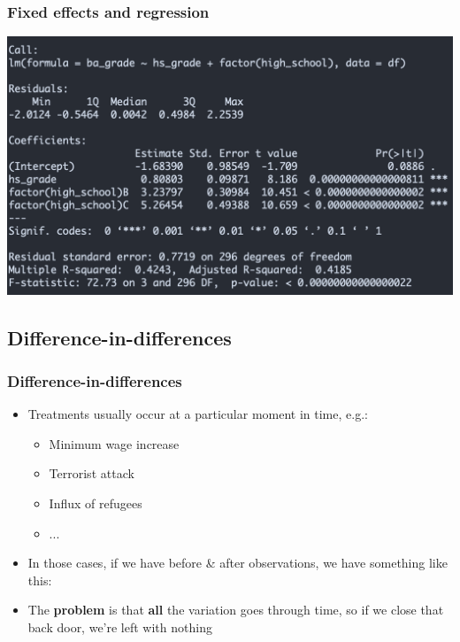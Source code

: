 \documentclass[aspectratio=43]{beamer}
\begin{document}
\begin{frame}
\frametitle{Fixed effects and regression}
\centering

\includegraphics[width = \textwidth]{../img/fe_lm2}

\end{frame}

\subsection{Difference-in-differences}

\begin{frame}
\frametitle{Difference-in-differences}
\centering

\begin{itemize}
  \item Treatments usually occur at a particular moment in time, e.g.:
  \begin{itemize}
    \item Minimum wage increase
    \item Terrorist attack
    \item Influx of refugees
    \item ...
  \end{itemize}
  \item In those cases, if we have before \& after observations, we have something like this:
\end{itemize}


\begin{itemize}
  \item The \textbf{problem} is that \textbf{all} the variation goes through time, so if we close that back door, we're left with nothing
\end{itemize}

\end{frame}
\end{document}

